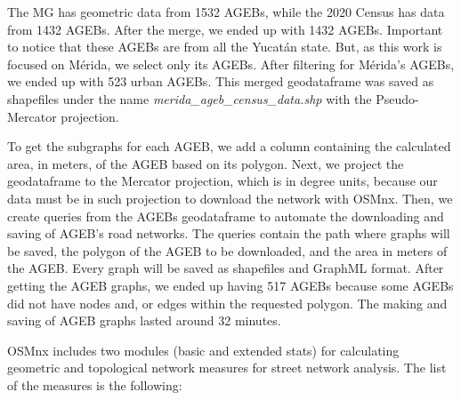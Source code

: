 The MG has geometric data from 1532 AGEBs, while the 2020 Census has data from 1432 AGEBs. After the merge, we ended up with 1432 AGEBs. Important to notice that these AGEBs are from all the Yucatán state. But, as this work is focused on Mérida, we select only its AGEBs. After filtering for Mérida's AGEBs, we ended up with 523 urban AGEBs. This merged geodataframe was saved as shapefiles under the name \textit{merida\_ageb\_census\_data.shp} with the Pseudo-Mercator projection.

To get the subgraphs for each AGEB, we add a column containing the calculated area, in meters, of the AGEB based on its polygon. Next, we project the geodataframe to the Mercator projection, which is in degree units, because our data must be in such projection to download the network with OSMnx. Then, we create queries from the AGEBs geodataframe to automate the downloading and saving of AGEB's road networks. The queries contain the path where graphs will be saved, the polygon of the AGEB to be downloaded, and the area in meters of the AGEB. Every graph will be saved as shapefiles and GraphML format. After getting the AGEB graphs, we ended up having 517 AGEBs because some AGEBs did not have nodes and, or edges within the requested polygon. The making and saving of AGEB graphs lasted around 32 minutes.

OSMnx includes two modules (basic and extended stats) for calculating geometric and topological network measures for street network analysis. The list of the measures is the following:

